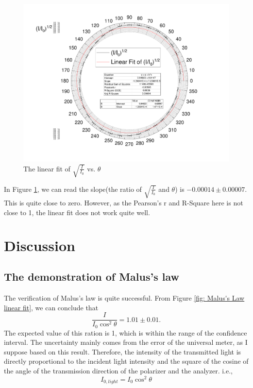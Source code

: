 \documentclass{my_template}
\begin{document}
    \begin{figure}[!ht]
        \centering
        \includegraphics[width=\textwidth]{fig/Linearfitfor45.pdf}
        \caption{The linear fit of $\sqrt{\frac{I}{I_0}}$ vs. $\theta$}
        \label{fig:linearfit45}
    \end{figure}
    In Figure \ref{fig:linearfit45}, we can read the slope(the ratio of $\sqrt{\frac{I}{I_0}}$ and $\theta$) is $-0.00014\pm 0.00007$. This is quite close to zero. However, as the Pearson's r and R-Square here is not close to 1, the linear fit does not work quite well. 
    \section{Discussion}
    \subsection{The demonstration of Malus's law}
    \paragraph{} The verification of Malus's law is quite successful. From Figure \ref{fig: Malus's Law linear fit}, we can conclude that $$\frac{I}{I_0\cos^2\theta}=1.01\pm 0.01.$$ The expected value of this ration is 1, which is within the range of the confidence interval. The uncertainty mainly comes from the error of the universal meter, as I suppose based on this result. Therefore, the intensity of the transmitted light is directly proportional to the incident light intensity and the square of the cosine of the angle of the transmission direction of the polarizer and the analyzer. i.e., $$I_{0,light}=I_0\cos^2\theta$$
\end{document}
